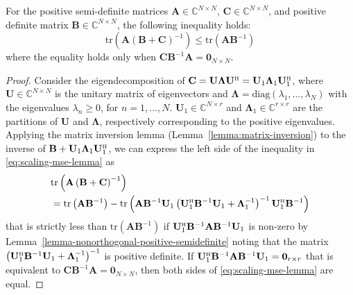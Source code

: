 \documentclass[SIG,biber]{nowfnt}
\newcommand{\vect}[1]{\mathbf{#1}}
\def\diag{\mathrm{diag}}
\def\tr{\mathrm{tr}}
\def\Htran{\mbox{\tiny $\mathrm{H}$}}
\begin{document}
\begin{lemma}\label{lemma:scaling-mse}
	For the positive semi-definite matrices $\vect{A} \in \mathbb{C}^{N \times N}$, $\vect{C} \in \mathbb{C}^{N \times N}$, and positive definite matrix $\vect{B} \in \mathbb{C}^{N \times N}$, the following inequality holds:
	\begin{equation} \label{eq:scaling-mse-lemma}
	\tr\left(\vect{A}\left(\vect{B}+\vect{C}\right)^{-1}\right)\leq \tr\left(\vect{A}\vect{B}^{-1}\right)
	\end{equation}
	where the equality holds only when $\vect{C}\vect{B}^{-1}\vect{A}=\vect{0}_{N \times N}$.
\end{lemma}
\begin{proof}
	Consider the eigendecomposition of $\vect{C}=\vect{U}\vect{\Lambda}\vect{U}^{\Htran}=\vect{U}_1\vect{\Lambda}_1\vect{U}_1^{\Htran}$, where $\vect{U}\in \mathbb{C}^{N \times N}$ is the unitary matrix of eigenvectors and $\vect{\Lambda}=\diag\left(\lambda_1,\ldots,\lambda_N\right)$ with the eigenvalues $\lambda_n\geq0$, for $n=1,\ldots,N$. $\vect{U}_1\in \mathbb{C}^{N \times r}$ and $\vect{\Lambda}_1\in \mathbb{C}^{r\times r}$ are the partitions of $\vect{U}$ and $\vect{\Lambda}$, respectively corresponding to the positive eigenvalues. Applying the matrix inversion lemma (Lemma~\ref{lemma:matrix-inversion}) to the inverse of $\vect{B}+\vect{U}_1\vect{\Lambda}_1\vect{U}_1^{\Htran}$, we can express the left side of the inequality in  \eqref{eq:scaling-mse-lemma} as 
	\begin{align}
	&\tr\left(\vect{A}\left(\vect{B}+\vect{C}\right)^{-1}\right)\nonumber\\
	&=\tr\left(\vect{A}\vect{B}^{-1}\right)-\tr\left(\vect{A}\vect{B}^{-1}\vect{U}_1\left(\vect{U}_1^{\Htran}\vect{B}^{-1}\vect{U}_1+\vect{\Lambda}_1^{-1}\right)^{-1}\vect{U}_1^{\Htran}\vect{B}^{-1}\right)
	\end{align}
	that is strictly less than $\tr\left(\vect{A}\vect{B}^{-1}\right)$ if $\vect{U}_1^{\Htran}\vect{B}^{-1}\vect{A}\vect{B}^{-1}\vect{U}_1$ is non-zero by Lemma~\ref{lemma-nonorthogonal-positive-semidefinite} noting that the matrix $\left(\vect{U}_1^{\Htran}\vect{B}^{-1}\vect{U}_1+\vect{\Lambda}_1^{-1}\right)^{-1}$ is positive definite. If $\vect{U}_1^{\Htran}\vect{B}^{-1}\vect{A}\vect{B}^{-1}\vect{U}_1=\vect{0}_{r \times r}$ that is equivalent to $\vect{C}\vect{B}^{-1}\vect{A}=\vect{0}_{N \times N}$, then both sides of 	\eqref{eq:scaling-mse-lemma} are equal.
\end{proof}
\end{document}
